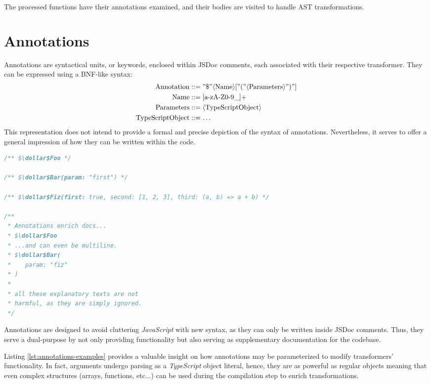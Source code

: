 The processed functions have their annotations examined, and
their bodies are visited to handle AST transformations.

\section{Annotations}
\label{sec:annotations}

Annotations are syntactical units, or keywords, enclosed within JSDoc comments,
each associated with their respective transformer.
They can be expressed using a BNF-like syntax:
\begin{equation*}
\begin{aligned}
    \text{Annotation} & ::= "\$" \langle \text{Name} \rangle [ "(" \langle \text{Parameters} \rangle ")" ] \\
    \text{Name} & ::= [\text{a-zA-Z0-9\_}]+ \\
    \text{Parameters} & ::= \langle \text{TypeScriptObject} \rangle \\
    \text{TypeScriptObject} & ::= \dots \\
\end{aligned}
\end{equation*}
This representation does not intend to provide a formal and precise depiction of the syntax of annotations.
Nevertheless, it serves to offer a general impression of how they can be written within the code.
\begin{lstlisting}[language=javascript, caption={Generic examples of annotation.}, label={lst:annotations-examples}]
/** $\dollar$Foo */

/** $\dollar$Bar(param: "first") */

/** $\dollar$Fiz(first: true, second: [1, 2, 3], third: (a, b) => a + b) */

/**
 * Annotations enrich docs...
 * $\dollar$Foo
 * ...and can even be multiline.
 * $\dollar$Bar(
 *    param: "fiz"
 * )
 *
 * all these explanatory texts are not 
 * harmful, as they are simply ignored.
 */
\end{lstlisting}

Annotations are designed to avoid cluttering \textit{JavaScript} with new syntax,
as they can only be written inside JSDoc comments.
Thus, they serve a dual-purpose by not only providing functionality
but also serving as supplementary documentation for the codebase.

Listing \ref{lst:annotations-examples} provides a valuable insight on how annotations
may be parameterized to modify transformers' functionality.
In fact, arguments undergo parsing as a \textit{TypeScript} object literal,
hence, they are as powerful as regular objects\cite{mdn_objects}
meaning that even complex structures (arrays, functions, etc...) can be used
during the compilation step to enrich transformations.

